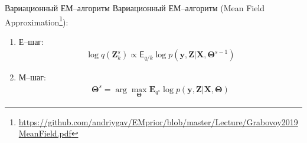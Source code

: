 \documentclass[9pt,pdf,hyperref={unicode}]{beamer}
\begin{document}
\begin{frame}{Вариационный ЕМ--алгоритм}
	Вариационный ЕМ--алгоритм (Mean Field Approximation\footnote[1]{\url{https://github.com/andriygav/EMprior/blob/master/Lecture/Grabovoy2019MeanField.pdf}}):
	\begin{enumerate}
		\item Е--шаг: 
			\begin{equation}
			\label{sl:1:eq:5}
				\begin{aligned}
					\log q\left(\textbf{Z}_{k}^{s}\right) \propto \mathsf{E}_{q/k}\log p\left(\textbf{y}, \textbf{Z}|\textbf{X},\bm{\Theta}^{s-1}\right)
				\end{aligned}
			\end{equation}
		\item М--шаг: 
			\begin{equation}
			\label{sl:1:eq:6}
				\begin{aligned}
					\bm{\Theta}^{s} = \arg\max_{\bm{\Theta}} \mathbf{E}_{q^{s}}\log p\left(\textbf{y}, \textbf{Z}|\textbf{X},\bm{\Theta}\right)
				\end{aligned}
			\end{equation}
	\end{enumerate}

\end{frame}
\end{document}
